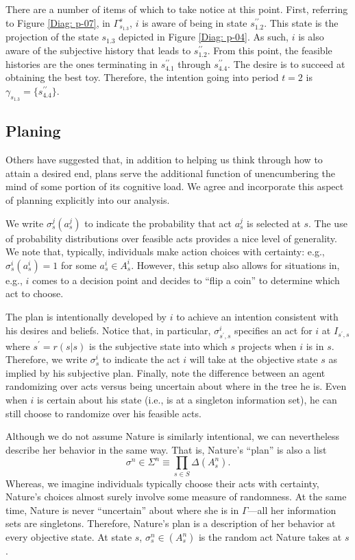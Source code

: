 \documentclass[
11pt,
titlepage,
reqno,
]{article}%
\theoremstyle{definition}
\begin{document}
There are a number of items of which to take notice at this point.
First, referring to Figure \ref{Diag: p-07}, in $\Gamma^s_{s_{1.3}} $, $i$ is aware of being in state $s^{\prime\prime}_{1.2}$.
This state is the projection of the state  $s_{1.3}$ depicted in Figure \ref{Diag: p-04}.
As such, $i$ is also aware of the subjective history that leads to $s^{\prime\prime}_{1.2}$.
From this point, the feasible histories are the ones terminating in $s^{\prime\prime}_{4.1}$ through $s^{\prime\prime}_{4.4}$.
The desire is to succeed at obtaining the best toy.
Therefore, the intention going into period $t=2$ is $\gamma_{s_{1.3}}=\{s^{\prime\prime}_{4.4}\}$.


 

\clearpage


\subsection{Planing}
Others have suggested that, in addition to helping us think through how to attain a desired end, plans serve the additional function of unencumbering the mind of some portion of its cognitive load. 
We agree and incorporate this aspect of planning explicitly into our analysis.

We write $\sigma^j_s(a^j_s)$ to indicate the probability that act $a^j_{s}$ is selected at $s$.
The use of probability distributions over feasible acts provides a nice level of generality.
We note that, typically, individuals make action choices with certainty: e.g., $\sigma^i_s(a^i_s) =1$ for some $a^i_s\in A^i_s$.
However, this setup also allows for situations in, e.g., $i$ comes to a decision point and decides to ``flip a coin'' to determine which act to choose.

The plan is intentionally developed by $i$ to achieve an intention consistent with his desires and beliefs.
Notice that, in particular, $\sigma^i_{s^\prime,s}$ specifies an act for $i$ at $I_{s^\prime,s}$ where $s^\prime=r(s|s)$ is the subjective state into which  $s$ projects when $i$ is in $s$.
Therefore,  we write $\sigma^i_s$ to indicate the act $i$ will take at the objective state $s$ as implied by his subjective plan.
Finally, note the difference between an agent randomizing over acts versus being uncertain about where in the tree he is. 
Even when $i$ is certain about his state (i.e., is at a singleton information set), he can still choose to randomize over his feasible acts.

Although we do not assume Nature is similarly intentional, we can nevertheless describe her behavior in the same way. 
That is, Nature's ``plan'' is also a list
\[
\sigma^n\in\Sigma^n\equiv \prod_{s\in S}\Delta(A^n_s).
\]
Whereas, we imagine individuals typically choose their acts with certainty, Nature's choices almost surely involve some measure of randomness.
At the same time, Nature is never ``uncertain'' about where she is in $\Gamma$---all her information sets are singletons.
Therefore, Nature's plan is a description of her behavior at every objective state.
At state $s$, $\sigma^n_s\in (A^n_s)$ is the random act Nature takes at $s$.
\end{document}
